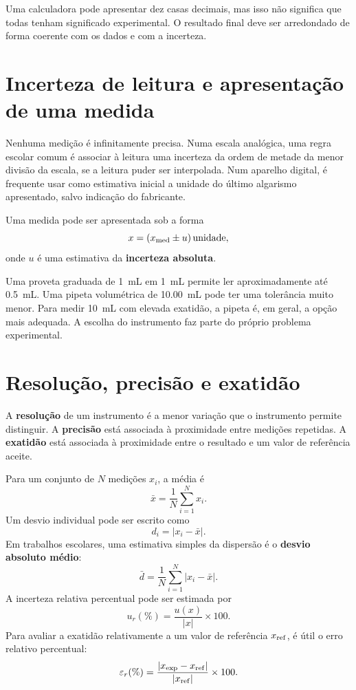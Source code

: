 \documentclass[11pt,a4paper,oneside]{book}
\begin{document}
\begin{nota}
Uma calculadora pode apresentar dez casas decimais, mas isso não significa que todas tenham significado experimental. O resultado final deve ser arredondado de forma coerente com os dados e com a incerteza.
\end{nota}

\section{Incerteza de leitura e apresentação de uma medida}
Nenhuma medição é infinitamente precisa. Numa escala analógica, uma regra escolar comum é associar à leitura uma incerteza da ordem de metade da menor divisão da escala, se a leitura puder ser interpolada. Num aparelho digital, é frequente usar como estimativa inicial a unidade do último algarismo apresentado, salvo indicação do fabricante.

Uma medida pode ser apresentada sob a forma
\[
x=(x_{\rm med}\pm u)\,\text{unidade},
\]
onde $u$ é uma estimativa da \textbf{incerteza absoluta}.

\begin{exemplo}[title=Exemplo resolvido -- proveta e pipeta]
Uma proveta graduada de \SI{1}{mL} em \SI{1}{mL} permite ler aproximadamente até \SI{0.5}{mL}. Uma pipeta volumétrica de \SI{10.00}{mL} pode ter uma tolerância muito menor. Para medir \SI{10}{mL} com elevada exatidão, a pipeta é, em geral, a opção mais adequada. A escolha do instrumento faz parte do próprio problema experimental.
\end{exemplo}

\section{Resolução, precisão e exatidão}
A \textbf{resolução} de um instrumento é a menor variação que o instrumento permite distinguir. A \textbf{precisão} está associada à proximidade entre medições repetidas. A \textbf{exatidão} está associada à proximidade entre o resultado e um valor de referência aceite.

Para um conjunto de $N$ medições $x_i$, a média é
\[
\bar{x}=\frac{1}{N}\sum_{i=1}^{N}x_i.
\]
Um desvio individual pode ser escrito como
\[
d_i=|x_i-\bar{x}|.
\]
Em trabalhos escolares, uma estimativa simples da dispersão é o \textbf{desvio absoluto médio}:
\[
\bar d=\frac{1}{N}\sum_{i=1}^{N}|x_i-\bar{x}|.
\]
A incerteza relativa percentual pode ser estimada por
\[
u_r(\%)=\frac{u(x)}{|x|}\times 100.
\]
Para avaliar a exatidão relativamente a um valor de referência $x_{\rm ref}$, é útil o erro relativo percentual:
\[
\varepsilon_r(\%)=\frac{|x_{\rm exp}-x_{\rm ref}|}{|x_{\rm ref}|}\times100.
\]
\end{document}
